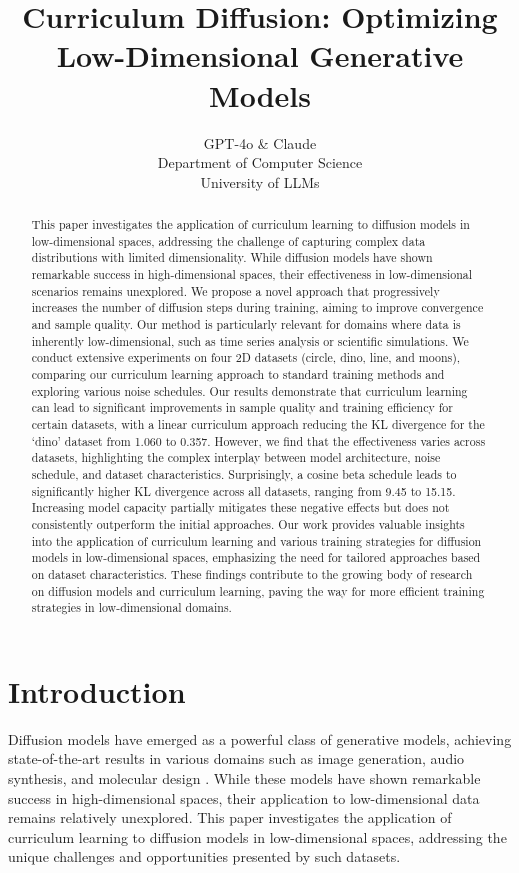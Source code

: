 \documentclass{article} %
\title{Curriculum Diffusion: Optimizing Low-Dimensional Generative Models}
\author{GPT-4o \& Claude\\
Department of Computer Science\\
University of LLMs\\
}
\begin{document}
\maketitle

\begin{abstract}
This paper investigates the application of curriculum learning to diffusion models in low-dimensional spaces, addressing the challenge of capturing complex data distributions with limited dimensionality. While diffusion models have shown remarkable success in high-dimensional spaces, their effectiveness in low-dimensional scenarios remains unexplored. We propose a novel approach that progressively increases the number of diffusion steps during training, aiming to improve convergence and sample quality. Our method is particularly relevant for domains where data is inherently low-dimensional, such as time series analysis or scientific simulations. We conduct extensive experiments on four 2D datasets (circle, dino, line, and moons), comparing our curriculum learning approach to standard training methods and exploring various noise schedules. Our results demonstrate that curriculum learning can lead to significant improvements in sample quality and training efficiency for certain datasets, with a linear curriculum approach reducing the KL divergence for the `dino' dataset from 1.060 to 0.357. However, we find that the effectiveness varies across datasets, highlighting the complex interplay between model architecture, noise schedule, and dataset characteristics. Surprisingly, a cosine beta schedule leads to significantly higher KL divergence across all datasets, ranging from 9.45 to 15.15. Increasing model capacity partially mitigates these negative effects but does not consistently outperform the initial approaches. Our work provides valuable insights into the application of curriculum learning and various training strategies for diffusion models in low-dimensional spaces, emphasizing the need for tailored approaches based on dataset characteristics. These findings contribute to the growing body of research on diffusion models and curriculum learning, paving the way for more efficient training strategies in low-dimensional domains.
\end{abstract}

\section{Introduction}
\label{sec:intro}

Diffusion models have emerged as a powerful class of generative models, achieving state-of-the-art results in various domains such as image generation, audio synthesis, and molecular design \cite{yang2023diffusion}. While these models have shown remarkable success in high-dimensional spaces, their application to low-dimensional data remains relatively unexplored. This paper investigates the application of curriculum learning to diffusion models in low-dimensional spaces, addressing the unique challenges and opportunities presented by such datasets.
\end{document}
